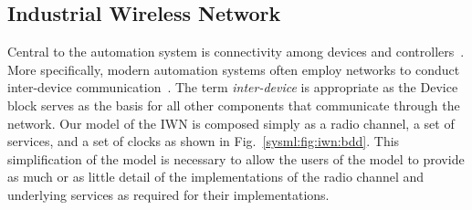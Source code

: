 \subsection{Industrial Wireless Network}

Central to the automation system is connectivity among devices and controllers~\cite{controlWSAN2010}.  More specifically, modern automation systems often employ networks to conduct inter-device communication~\cite{wirelessAutomation2017}.  The term \textit{inter-device} is appropriate as the Device block serves as the basis for all other components that communicate through the network.  Our model of the IWN is composed simply as a radio channel, a set of services, and a set of clocks as shown in Fig.~\ref{sysml:fig:iwn:bdd}.  This simplification of the model is necessary to allow the users of the model to provide as much or as little detail of the implementations of the radio channel and underlying services as required for their implementations.


